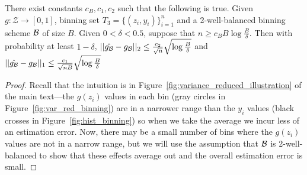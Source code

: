 \begin{lemma}
\label{thm:empirical-binning}
There exist constants $c_B, c_1, c_2$ such that the following is true. Given $g : \mathcal{Z} \to [0, 1]$, binning set $T_3 = \{(z_i, y_i)\}_{i=1}^n$ and a 2-well-balanced binning scheme $\mathcal{B}{}$ of size $B$. Given $0 < \delta < 0.5$, suppose that $n \geq c_B B\log{\frac{B}{\delta}}$. Then with probability at least $1 - \delta$,  $||\hat{g_{\mathcal{B}{}}} - g_{\mathcal{B}{}}||_2 \leq \frac{c_2}{\sqrt{n}}\sqrt{\log{\frac{B}{\delta}}}$ and $||\hat{g_{\mathcal{B}{}}} - g_{\mathcal{B}{}}||_1 \leq \frac{c_1}{\sqrt{nB}}\sqrt{\log{\frac{B}{\delta}}}$
\end{lemma}

\begin{proof}

Recall that the intuition is in Figure~\ref{fig:variance_reduced_illustration} of the main text---the $g(z_i)$ values in each bin (gray circles in Figure~\ref{fig:var_red_binning}) are in a narrower range than the $y_i$ values (black crosses in Figure~\ref{fig:hist_binning}) so when we take the average we incur less of an estimation error. Now, there may be a small number of bins where the $g(z_i)$ values are not in a narrow range, but we will use the assumption that $\mathcal{B}{}$ is 2-well-balanced to show that these effects average out and the overall estimation error is small.


\end{proof}
